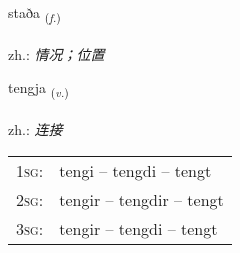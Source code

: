 \documentclass[frontgrid, backgrid]{flacards}\usepackage[]{graphicx}\usepackage[]{xcolor}
\begin{document}
\renewcommand{\blhead}{\vskip5pt {\small\bfseries\footnotesize Nafnorð | 名词 }}
\renewcommand{\bcfoot}{\vskip5pt \hspace{2pt}{\small\bfseries\footnotesize 1K}}


{staða \small{\textsubscript{(\textit{f.})}} \\[1ex] %
\textphonetic{[staːða]} \\
zh.: \emph{情况；位置} \\  [2ex]
\renewcommand*{\arraystretch}{0.8}
}

\renewcommand{\flhead}{\vskip5pt \fboxsep=0pt {\small\bfseries\footnotesize Sagnorð | 动词}}
\renewcommand{\fcfoot}{\vskip5pt \fboxsep=0pt \hspace{2pt}{\small\bfseries\footnotesize 1K}}

\renewcommand{\blhead}{\vskip5pt {\small\bfseries\footnotesize Sagnorð | 动词 }}
\renewcommand{\bcfoot}{\vskip5pt \hspace{2pt}{\small\bfseries\footnotesize 1K}}


{tengja \small{\textsubscript{(\textit{v.})}} \\[1ex] %
\textphonetic{[tʰeiɲca]} \\
zh.: \emph{连接} \\  [2ex]
\renewcommand*{\arraystretch}{0.8}
\begin{tabular}{p{1cm}l}
\textsc{1sg}: & tengi -- tengdi -- tengt \\ 
\textsc{2sg}: & tengir -- tengdir -- tengt \\ 
\textsc{3sg}: & tengir -- tengdi -- tengt \\ 
\end{tabular}
}

\renewcommand{\flhead}{\vskip5pt \fboxsep=0pt {\small\bfseries\footnotesize Nafnorð | 名词}}
\renewcommand{\fcfoot}{\vskip5pt \fboxsep=0pt \hspace{2pt}{\small\bfseries\footnotesize 1K}}
\end{document}
